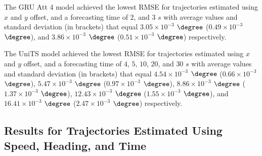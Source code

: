 \begin{table}[!ht]
	\centering
	\caption{The average RMSE ($\times 10^{-3}$), with standard deviation in brackets, across $k$-fold validation datasets for the trajectories in the $k$-fold testing datasets estimated using $x$ and $y$ offset, different RNN models, and forecasting times.}
	\label{tab:best_no_abs_RMSE}
\end{table}

The GRU Att 4 model achieved the lowest RMSE for trajectories estimated using $x$ and $y$ offset, and a forecasting time of $2$, and $3$ $s$ with average values and standard deviation (in brackets) that equal $3.05 \times 10^{-3}$ $\degree$ ($0.49 \times 10^{-3}$ $\degree$), and $3.86 \times 10^{-3}$ $\degree$ ($0.51 \times 10^{-3}$ $\degree$) respectively.

The UniTS model achieved the lowest RMSE for trajectories estimated using $x$ and $y$ offset, and a forecasting time of $4$, $5$, $10$, $20$, and $30$ $s$ with average values and standard deviation (in brackets) that equal $4.54 \times 10^{-3}$ $\degree$ ($0.66 \times 10^{-3}$ $\degree$), $5.47 \times 10^{-3}$ $\degree$ ($0.97 \times 10^{-3}$ $\degree$), $8.86 \times 10^{-3}$ $\degree$ ($1.37 \times 10^{-3}$ $\degree$), $12.43 \times 10^{-3}$ $\degree$ ($1.55 \times 10^{-3}$ $\degree$), and $16.41 \times 10^{-3}$ $\degree$ ($2.47 \times 10^{-3}$ $\degree$) respectively.

\subsection{Results for Trajectories Estimated Using Speed, Heading, and Time}

